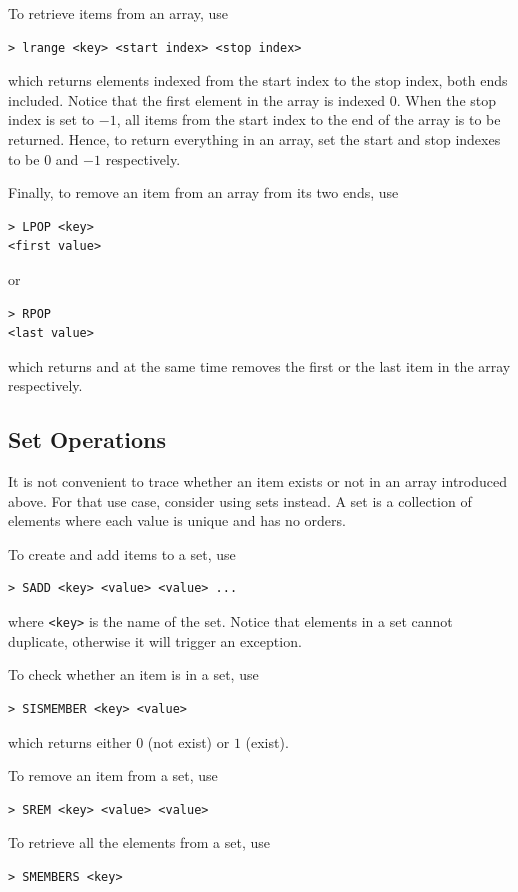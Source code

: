 To retrieve items from an array, use
\begin{lstlisting}
> lrange <key> <start index> <stop index>
\end{lstlisting}
which returns elements indexed from the start index to the stop index, both ends included. Notice that the first element in the array is indexed $0$. When the stop index is set to $-1$, all items from the start index to the end of the array is to be returned. Hence, to return everything in an array, set the start and stop indexes to be $0$ and $-1$ respectively.

Finally, to remove an item from an array from its two ends, use
\begin{lstlisting}
> LPOP <key>
<first value>
\end{lstlisting}
or
\begin{lstlisting}
> RPOP
<last value>
\end{lstlisting}
which returns and at the same time removes the first or the last item in the array respectively.

\subsection{Set Operations}

It is not convenient to trace whether an item exists or not in an array introduced above. For that use case, consider using sets instead. A set is a collection of elements where each value is unique and has no orders.

To create and add items to a set, use
\begin{lstlisting}
> SADD <key> <value> <value> ...
\end{lstlisting}
where \verb|<key>| is the name of the set. Notice that elements in a set cannot duplicate, otherwise it will trigger an exception.

To check whether an item is in a set, use
\begin{lstlisting}
> SISMEMBER <key> <value>
\end{lstlisting}
which returns either $0$ (not exist) or $1$ (exist).

To remove an item from a set, use
\begin{lstlisting}
> SREM <key> <value> <value>
\end{lstlisting}

To retrieve all the elements from a set, use
\begin{lstlisting}
> SMEMBERS <key>
\end{lstlisting}

